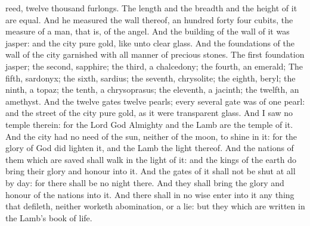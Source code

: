 {reed,
twelve
thousand
furlongs. The
length
and the
breadth
and the
height of
it
are
equal.
And he
measured the
wall
thereof, an
hundred
{}
forty
{}
four
cubits,
{} the
measure of a
man,
that
is, of the
angel.
And the
building of the
wall of
it
was
{}
jasper:
and the
city
{}
pure
gold, like
unto
clear
glass.
And the
foundations of the
wall of the
city
{}
garnished with all
manner of
precious
stones. The
first
foundation
{}
jasper; the
second,
sapphire; the
third, a
chalcedony; the
fourth, an
emerald;
The
fifth,
sardonyx; the
sixth,
sardius; the
seventh,
chrysolite; the
eighth,
beryl; the
ninth, a
topaz; the
tenth, a
chrysoprasus; the
eleventh, a
jacinth; the
twelfth, an
amethyst.
And the
twelve
gates
{}
twelve
pearls;
every
several
gate
was
of
one
pearl:
and the
street of the
city
{}
pure
gold, as it
were
transparent
glass.
And I
saw
no
temple
therein:
for the
Lord
God
Almighty
and the
Lamb
are the
temple of
it.
And the
city
had
no
need of the
sun,
neither of the
moon,
to
shine
in
it:
for the
glory of
God did
lighten
it,
and the
Lamb
{} the
light
thereof.
And the
nations of
them which are
saved shall
walk
in the
light of
it:
and the
kings of the
earth do
bring
their
glory
and
honour
into
it.
And the
gates of
it
shall
not be
shut at
all by
day:
for there shall
be
no
night
there.
And they shall
bring the
glory
and
honour of the
nations
into
it.
And there
shall in no
wise
enter
into
it any
thing that
defileth,
neither
{}
worketh
abomination,
or
{} a
lie:
but
they which are
written
in the
Lamb’s
book of
life.

}
